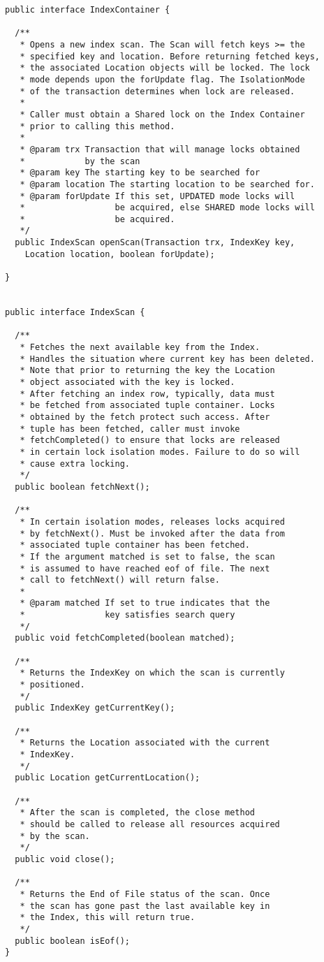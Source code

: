 \documentclass[a4paper,draft,oneside]{book}
\begin{document}
\begin{verbatim}
public interface IndexContainer {
	
  /**
   * Opens a new index scan. The Scan will fetch keys >= the 
   * specified key and location. Before returning fetched keys, 
   * the associated Location objects will be locked. The lock 
   * mode depends upon the forUpdate flag. The IsolationMode
   * of the transaction determines when lock are released. 
   * 
   * Caller must obtain a Shared lock on the Index Container 
   * prior to calling this method.
   * 
   * @param trx Transaction that will manage locks obtained 
   *            by the scan
   * @param key The starting key to be searched for
   * @param location The starting location to be searched for.
   * @param forUpdate If this set, UPDATED mode locks will 
   *                  be acquired, else SHARED mode locks will
   *                  be acquired.
   */
  public IndexScan openScan(Transaction trx, IndexKey key, 
    Location location, boolean forUpdate);	
	
}


public interface IndexScan {
	
  /**
   * Fetches the next available key from the Index. 
   * Handles the situation where current key has been deleted.
   * Note that prior to returning the key the Location 
   * object associated with the key is locked.
   * After fetching an index row, typically, data must 
   * be fetched from associated tuple container. Locks 
   * obtained by the fetch protect such access. After 
   * tuple has been fetched, caller must invoke 
   * fetchCompleted() to ensure that locks are released 
   * in certain lock isolation modes. Failure to do so will 
   * cause extra locking.
   */
  public boolean fetchNext();
	
  /**
   * In certain isolation modes, releases locks acquired 
   * by fetchNext(). Must be invoked after the data from 
   * associated tuple container has been fetched.
   * If the argument matched is set to false, the scan 
   * is assumed to have reached eof of file. The next
   * call to fetchNext() will return false.
   * 
   * @param matched If set to true indicates that the 
   *                key satisfies search query
   */
  public void fetchCompleted(boolean matched);
	
  /**
   * Returns the IndexKey on which the scan is currently 
   * positioned.
   */
  public IndexKey getCurrentKey();
	
  /**
   * Returns the Location associated with the current 
   * IndexKey.
   */
  public Location getCurrentLocation();
	
  /**
   * After the scan is completed, the close method 
   * should be called to release all resources acquired 
   * by the scan.
   */
  public void close();
	
  /**
   * Returns the End of File status of the scan. Once 
   * the scan has gone past the last available key in 
   * the Index, this will return true.  
   */
  public boolean isEof();
}

\end{verbatim}
\end{document}
